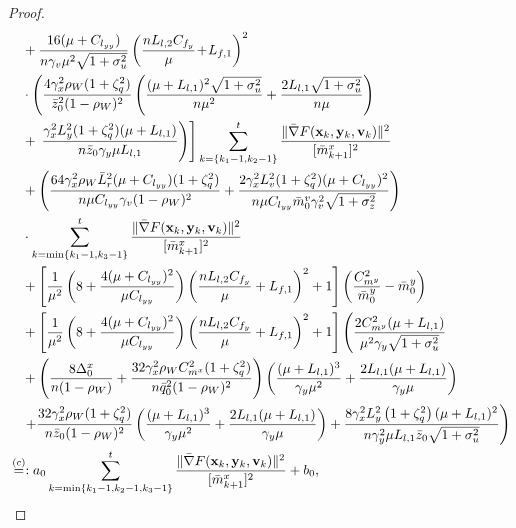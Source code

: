 \documentclass{article}
\theoremstyle{plain}
\theoremstyle{definition}
\theoremstyle{remark}
\begin{document}
\begin{proof}
\begin{align}
&\quad +\frac{16(\mu + C_{l_{yy}})}{n\gamma_v\mu^2\sqrt{1+\sigma_u^2}}\left(\frac{nL_{l,2}C_{f_y}}{\mu}\!+\!L_{f,1}\right)^2\nonumber\\
&\quad\cdot\left(\frac{4 \gamma_x^2 \rho_W (1 + \zeta_q^2)}{\bar{z}_0^2(1 - \rho_W)^2} \left(\frac{(\mu+L_{l,1})^2\sqrt{1+\sigma_u^2}}{n\mu^2 }+\frac{2L_{l,1}\sqrt{1+\sigma_u^2}}{n\mu }\right)\right.\nonumber\\
&\quad +\left.\left.\frac{\gamma_x^2L_y^2(1+\zeta_q^2)(\mu + L_{l,1})}{n\bar{z}_0\gamma_y \mu L_{l,1}}\right)\right]
\sum_{k=\{k_1-1,k_2-1\}}^{t}  \frac{\| \bar{\nabla} F(\mathbf{x}_{k},\mathbf{y}_{k},\mathbf{v}_{k})\|^2}{[\bar{m}^x_{k+1}]^2}\notag\\
&\quad + \left(\frac{64 \gamma_x^2 \rho_W \bar{L}_r^2(\mu + C_{l_{yy}})(1 + \zeta_q^2)}{n\mu C_{l_{yy}}\gamma_v(1 - \rho_W)^2} + \frac{2\gamma_x^2L_v^2(1+\zeta_q^2)(\mu + C_{l_{yy}})^2}{n\mu C_{l_{yy}}\bar{m}_0^v\gamma_v^2\sqrt{1+\sigma_z^2}}\right)\nonumber\\
&\quad\cdot\sum_{k=\min\{k_1-1,k_3-1\}}^{t} 
 \frac{\| \bar{\nabla} F(\mathbf{x}_{k},\mathbf{y}_{k},\mathbf{v}_{k})\|^2}{[\bar{m}^x_{k+1}]^2} \notag \\
&\quad  +\left[ \frac{1}{\mu^2}\left(8+\frac{4(\mu + C_{l_{yy}})^2}{\mu C_{l_{yy}}} \right)\left(\frac{nL_{l,2}C_{f_y}}{\mu}+L_{f,1}\right)^2+1\right]\left(\frac{C_{m^y}^2}{\bar{m}^y_0} - {\bar{m}^y_0}\right)  \notag \\
&\quad  +\left[ \frac{1}{\mu^2}\left(8+\frac{4(\mu + C_{l_{yy}})^2}{\mu C_{l_{yy}}} \right)\left(\frac{nL_{l,2}C_{f_y}}{\mu}+L_{f,1}\right)^2+1\right]\left(\frac{ 2C_{m^y}^2(\mu + L_{l,1})}{\mu^2\gamma_y\sqrt{1+\sigma_u^2}} \right.\notag\\
&\quad+\left(\frac{8\Delta_0^x}{n(1-\rho_W)}+\frac{32 \gamma_x^2 \rho_WC_{m^x}^2 (1 + \zeta_q^2)}{n\bar{q}_0^2(1 - \rho_W)^2} \right)\left(\frac{(\mu+L_{l,1})^3}{\gamma_y\mu^2}+\frac{2L_{l,1}(\mu+L_{l,1})}{\gamma_y\mu}\right)\nonumber\\
&\quad\left.+ \frac{32 \gamma_x^2 \rho_W(1 + \zeta_q^2)}{n\bar{z}_0(1 - \rho_W)^2} \left(\frac{(\mu+L_{l,1})^3}{\gamma_y\mu^2}+\frac{2L_{l,1}(\mu+L_{l,1})}{\gamma_y\mu}\right)+\frac{8\gamma_x^2  L_y^2\left( 1 + \zeta_q^2 \right) (\mu + L_{l,1})^2}{n\gamma_y^2\mu L_{l,1}\bar{z}_0\sqrt{1+\sigma_u^2}} \right)\nonumber\\
&\overset{(c)}{=}: a_0 \sum_{k=\min\{k_1-1,k_2-1, k_3-1\}}^t \frac{\| \bar{\nabla} F(\mathbf{x}_{k},\mathbf{y}_{k},\mathbf{v}_{k})\|^2}{[\bar{m}^x_{k+1}]^2} + b_0, \notag \\

\end{align}
\end{proof}
\end{document}
